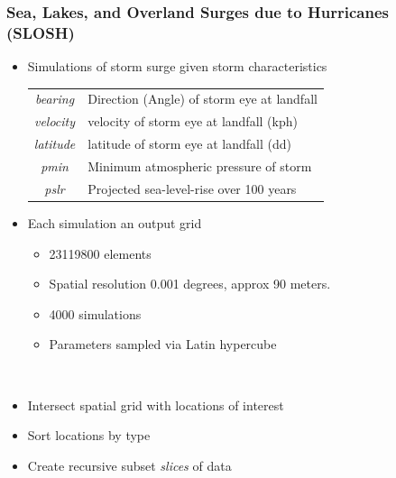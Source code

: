 \documentclass[aspectratio=169,10pt]{beamer}
\begin{document}
\begin{frame}
    \frametitle{Sea, Lakes, and Overland Surges due to Hurricanes (SLOSH)}
    \begin{minipage}{0.54\textwidth}
    {\footnotesize
    \begin{itemize}
        \item Simulations of storm surge given storm characteristics \par
        \begin{tabular}{cl}
            \textit{bearing}  & Direction (Angle) of storm eye at landfall \\
            \textit{velocity} & velocity of storm eye at landfall (kph)    \\
            \textit{latitude} & latitude of storm eye at landfall (dd)     \\
            \textit{pmin}     & Minimum atmospheric pressure of storm      \\
            \textit{pslr}     & Projected sea-level-rise over 100 years    \\
            \end{tabular}
        \item Each simulation an output grid
        \begin{itemize}
            \item \num{23119800} elements
            \item Spatial resolution 0.001 degrees, approx 90 meters.
        \item 4000 simulations
        \item Parameters sampled via Latin hypercube
        \end{itemize}
    \end{itemize}
    }
    \end{minipage}%
    ~
    \begin{minipage}{0.44\textwidth}
        {\footnotesize
        \begin{itemize}
            \item Intersect spatial grid with locations of interest
            \item Sort locations by type
            \item Create recursive subset \emph{slices} of data
            \begin{center}
            {\scriptsize
            
            }
            \end{center}
            
            \vfill
            
            ~
        \end{itemize}
        
        }
    \end{minipage}
\end{frame} %
\end{document}
